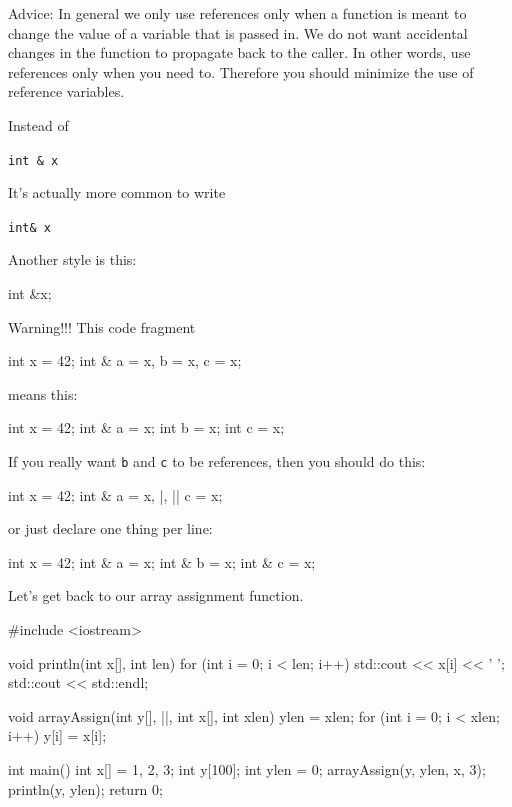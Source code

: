 

Advice: In general we only use references only when a function is meant to change the value of a variable that is passed in. We do not want accidental changes in the function to propagate back to the caller. In other words, use references only when you need to. Therefore you should minimize the use of reference variables.


\newpage{}

Instead of

\texttt{int \& x}

It's actually more common to write

\texttt{int\& x}

Another style is this:

int \&x;


\newpage{}

Warning!!! This code fragment

\begin{consolethree}[escapeinside=||]
int x = 42;
int & a = x, b = x, c = x;
\end{consolethree}

means this:

\begin{consolethree}[escapeinside=||]
int x = 42;
int & a = x;
int b = x;
int c = x;
\end{consolethree}

If you really want \texttt{b} and \texttt{c} to be references, then you should do this:

\begin{consolethree}[escapeinside=||]
int x = 42;
int & a = x, |, |\EMPHASIZE{\&}| c = x;
\end{consolethree}

or just declare one thing per line:

\begin{consolethree}[escapeinside=||]
int x = 42;
int & a = x;
int & b = x;
int & c = x;
\end{consolethree}


\newpage{}

Let's get back to our array assignment function.

\begin{consolethree}[escapeinside=||]
#include <iostream>

void println(int x[], int len)
{
    for (int i = 0; i < len; i++)
    {
        std::cout << x[i] << ' ';
    }
    std::cout << std::endl;
}

void arrayAssign(int y[], ||,
                 int x[], int xlen)
{
    ylen = xlen;
    for (int i = 0; i < xlen; i++)
    {
        y[i] = x[i];
    }
}

int main()
{
    int x[] = {1, 2, 3};
    int y[100];
    int ylen = 0;
    arrayAssign(y, ylen, x, 3);
    println(y, ylen);
    return 0;
}
\end{consolethree}

